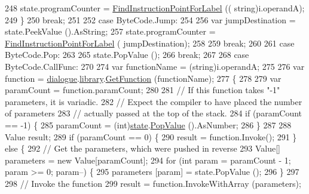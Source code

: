 \begin{DoxyCode}
248                     state.programCounter = \hyperlink{a00152_af613c8b2d098678b6ea05b509c0a0cb6}{FindInstructionPointForLabel} ((\textcolor{keywordtype}{
      string})i.operandA);
249                 \}
250                 \textcolor{keywordflow}{break};
251 
252             \textcolor{keywordflow}{case} ByteCode.Jump:
254 
256                 var jumpDestination = state.PeekValue ().AsString;
257                 state.programCounter = \hyperlink{a00152_af613c8b2d098678b6ea05b509c0a0cb6}{FindInstructionPointForLabel} (
      jumpDestination);
258 
259                 \textcolor{keywordflow}{break};
260 
261             \textcolor{keywordflow}{case} ByteCode.Pop:
263 
265                 state.PopValue ();
266                 \textcolor{keywordflow}{break};
267 
268             \textcolor{keywordflow}{case} ByteCode.CallFunc:
270 
274                 var functionName = (string)i.operandA;
275 
276                 var \textcolor{keyword}{function} = \hyperlink{a00152_ac506426c503da5f033247c29e11c5e82}{dialogue}.\hyperlink{a00082_ae660d4cfb6e296358d2f61d8ee74c66a}{library}.\hyperlink{a00119_aacfb1f00ad8aa3921941b8d8af0960e0}{GetFunction} (functionName);
277                 \{
278 
279                     var paramCount = function.paramCount;
280 
281                     \textcolor{comment}{// If this function takes "-1" parameters, it is variadic.}
282                     \textcolor{comment}{// Expect the compiler to have placed the number of parameters}
283                     \textcolor{comment}{// actually passed at the top of the stack.}
284                     \textcolor{keywordflow}{if} (paramCount == -1) \{
285                         paramCount = (int)\hyperlink{a00152_a70f2ce6201cdd2430ceaa764ac614ca0}{state}.\hyperlink{a00155_a36881a888ea2839d74c3d4e7c199f4ee}{PopValue} ().AsNumber;
286                     \}
287 
288                     Value result;
289                     \textcolor{keywordflow}{if} (paramCount == 0) \{
290                         result = function.Invoke();
291                     \} \textcolor{keywordflow}{else} \{
292                         \textcolor{comment}{// Get the parameters, which were pushed in reverse}
293                         Value[] parameters = \textcolor{keyword}{new} Value[paramCount];
294                         \textcolor{keywordflow}{for} (\textcolor{keywordtype}{int} param = paramCount - 1; param >= 0; param--) \{
295                             parameters [param] = state.PopValue ();
296                         \}
297 
298                         \textcolor{comment}{// Invoke the function}
299                         result = function.InvokeWithArray (parameters);

\end{DoxyCode}
